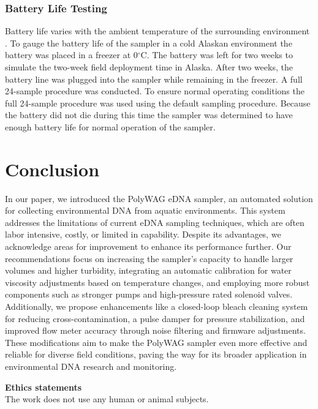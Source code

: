 \documentclass[11pt, letterpaper]{article}
\begin{document}
\subsubsection{Battery Life Testing}
Battery life varies with the ambient temperature of the surrounding environment \cite{art:Battery}. To gauge the battery life of the sampler in a cold Alaskan environment the battery was placed in a freezer at 0$^\circ$C. The battery was left for two weeks to simulate the two-week field deployment time in Alaska. After two weeks, the battery line was plugged into the sampler while remaining in the freezer. A full 24-sample procedure was conducted. To ensure normal operating conditions the full 24-sample procedure was used using the default sampling procedure. Because the battery did not die during this time the sampler was determined to have enough battery life for normal operation of the sampler.


\section{Conclusion}


In our paper, we introduced the PolyWAG eDNA sampler, an automated solution for collecting environmental DNA from aquatic environments. This system addresses the limitations of current eDNA sampling techniques, which are often labor intensive, costly, or limited in capability. Despite its advantages, we acknowledge areas for improvement to enhance its performance further. Our recommendations focus on increasing the sampler's capacity to handle larger volumes and higher turbidity, integrating an automatic calibration for water viscosity adjustments based on temperature changes, and employing more robust components such as stronger pumps and high-pressure rated solenoid valves. Additionally, we propose enhancements like a closed-loop bleach cleaning system for reducing cross-contamination, a pulse damper for pressure stabilization, and improved flow meter accuracy through noise filtering and firmware adjustments. These modifications aim to make the PolyWAG sampler even more effective and reliable for diverse field conditions, paving the way for its broader application in environmental DNA research and monitoring.


\par\noindent\newline
\textbf{Ethics statements}\\
\noindent
The work does not use any human or animal subjects.\\
\end{document}
